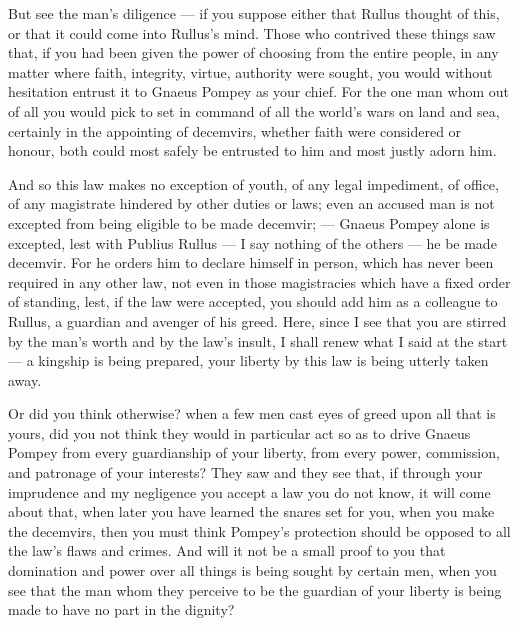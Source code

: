  But see the man's diligence --- if you suppose either that Rullus thought of this, or that it could come into Rullus's mind. Those who contrived these things saw that, if you had been given the power of choosing from the entire people, in any matter where faith, integrity, virtue, authority were sought, you would without hesitation entrust it to Gnaeus Pompey as your chief. For the one man whom out of all you would pick to set in command of all the world's wars on land and sea, certainly in the appointing of decemvirs, whether faith were considered or honour, both could most safely be entrusted to him and most justly adorn him.

 And so this law makes no exception of youth, of any legal impediment, of office, of any magistrate hindered by other duties or laws; even an accused man is not excepted from being eligible to be made decemvir; --- Gnaeus Pompey alone is excepted, lest with Publius Rullus --- I say nothing of the others --- he be made decemvir. For he orders him to declare himself in person, which has never been required in any other law, not even in those magistracies which have a fixed order of standing, lest, if the law were accepted, you should add him as a colleague to Rullus, a guardian and avenger of his greed. Here, since I see that you are stirred by the man's worth and by the law's insult, I shall renew what I said at the start --- a kingship is being prepared, your liberty by this law is being utterly taken away.

 Or did you think otherwise? when a few men cast eyes of greed upon all that is yours, did you not think they would in particular act so as to drive Gnaeus Pompey from every guardianship of your liberty, from every power, commission, and patronage of your interests? They saw and they see that, if through your imprudence and my negligence you accept a law you do not know, it will come about that, when later you have learned the snares set for you, when you make the decemvirs, then you must think Pompey's protection should be opposed to all the law's flaws and crimes. And will it not be a small proof to you that domination and power over all things is being sought by certain men, when you see that the man whom they perceive to be the guardian of your liberty is being made to have no part in the dignity?

